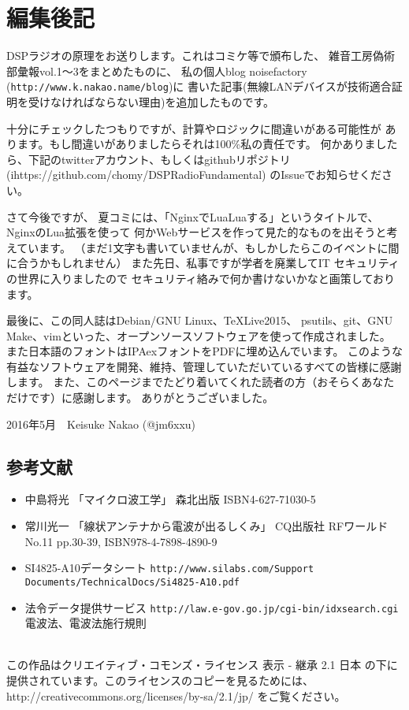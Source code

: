 \section*{編集後記}
DSPラジオの原理をお送りします。これはコミケ等で頒布した、
雑音工房偽術部彙報vol.1〜3をまとめたものに、
私の個人blog noisefactory (\texttt{http://www.k.nakao.name/blog})に
書いた記事(無線LANデバイスが技術適合証明を受けなければならない理由)を追加したものです。

十分にチェックしたつもりですが、計算やロジックに間違いがある可能性が
あります。もし間違いがありましたらそれは100\%私の責任です。
何かありましたら、下記のtwitterアカウント、もしくはgithubリポジトリ
(ihttps://github.com/chomy/DSPRadioFundamental)
のIssueでお知らせください。


さて今後ですが、
夏コミには、「NginxでLuaLuaする」というタイトルで、NginxのLua拡張を使って
何かWebサービスを作って見た的なものを出そうと考えています。
（まだ1文字も書いていませんが、もしかしたらこのイベントに間に合うかもしれません）
また先日、私事ですが学者を廃業してIT セキュリティの世界に入りましたので
セキュリティ絡みで何か書けないかなと画策しております。

最後に、この同人誌はDebian/GNU Linux、\TeX Live2015、
psutils、git、GNU Make、vimといった、オープンソースソフトウェアを使って作成されました。
また日本語のフォントはIPAexフォントをPDFに埋め込んでいます。
このような有益なソフトウェアを開発、維持、管理していただいているすべての皆様に感謝します。
また、このページまでたどり着いてくれた読者の方（おそらくあなただけです）に感謝します。
ありがとうございました。

\begin{flushright}
2016年5月　Keisuke Nakao (@jm6xxu) 
\end{flushright}
\clearpage
\subsection*{参考文献}
\begin{itemize}
  \item 中島将光
    「マイクロ波工学」 森北出版 ISBN4-627-71030-5
  \item 常川光一
    「線状アンテナから電波が出るしくみ」 CQ出版社 RFワールド No.11 pp.30-39, ISBN978-4-7898-4890-9

  \item 
    SI4825-A10データシート \texttt{http://www.silabs.com/Support Documents/TechnicalDocs/Si4825-A10.pdf}
	\item
	法令データ提供サービス \texttt{http://law.e-gov.go.jp/cgi-bin/idxsearch.cgi} 電波法、電波法施行規則
   \end{itemize}
\clearpage
\mbox{}
\vspace{36em}\\
この作品はクリエイティブ・コモンズ・ライセンス 表示 - 継承 2.1 日本 の下に提供されています。このライセンスのコピーを見るためには、http://creativecommons.org/licenses/by-sa/2.1/jp/ をご覧ください。
